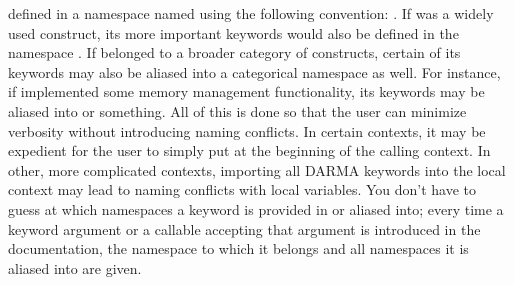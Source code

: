 defined in a namespace named using the following convention:
.
If  was a 
widely used construct, its more important keywords would also be defined 
in the namespace . 
If  belonged to a broader category of 
constructs, certain of its keywords may also be aliased into a 
categorical namespace as well.  For instance, if  
implemented some memory management functionality,
its keywords may be aliased into  or 
something.  All of this is done so that the user can minimize verbosity without introducing
naming conflicts.  In certain contexts, it may be expedient for the user to simply
put  at the beginning of the calling context. 
In other, more complicated contexts, importing all DARMA keywords into the 
local context may lead to naming conflicts with local variables. 
You don't have to guess at which namespaces
a keyword is provided in or aliased into; every time a keyword argument or a callable
accepting that argument is introduced in the documentation, the namespace to which 
it belongs and all namespaces it is aliased into are given.



